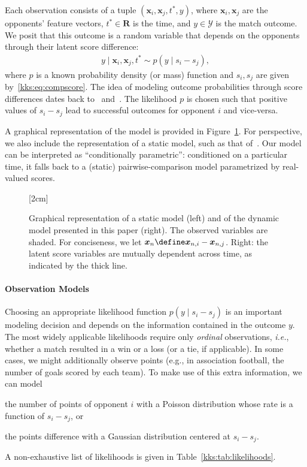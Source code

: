 Each observation consists of a tuple $(\bm{x}_i, \bm{x}_j, t^*, y)$, where $\bm{x}_i, \bm{x}_j$ are the opponents' feature vectors, $t^* \in \mathbf{R}$ is the time, and $y \in \mathcal{Y}$ is the match outcome.
We posit that this outcome is a random variable that depends on the opponents through their latent score difference:
\begin{align*}
	y \mid \bm{x}_i, \bm{x}_j, t^* \sim p( y \mid s_i - s_j ),
\end{align*}
where $p$ is a known probability density (or mass) function and $s_i, s_j$ are given by~\eqref{kks:eq:compscore}.
The idea of modeling outcome probabilities through score differences dates back to~\citet{thurstone1927law} and~\citet{zermelo1928berechnung}.
The likelihood $p$ is chosen such that positive values of $s_i - s_j$ lead to successful outcomes for opponent $i$ and vice-versa.

A graphical representation of the model is provided in Figure~\ref{kks:fig:pgms}.
For perspective, we also include the representation of a static model, such as that of~\citet{thurstone1927law}.
Our model can be interpreted as ``conditionally parametric'': conditioned on a particular time, it falls back to a (static) pairwise-comparison model parametrized by real-valued scores.

\begin{figure}[t]
	[2cm]{
		
	}
	\hfill
	\caption{
		Graphical representation of a static model (left) and of the dynamic model presented in this paper (right).
		The observed variables are shaded.
		For conciseness, we let $\bm{x}_n \define \bm{x}_{n,i} - \bm{x}_{n,j}$.
		Right: the latent score variables are mutually dependent across time, as indicated by the thick line.}
	\label{kks:fig:pgms}
\end{figure}

\paragraph{Observation Models}
Choosing an appropriate likelihood function $p(y \mid s_i - s_j)$ is an important modeling decision and depends on the information contained in the outcome $y$.
The most widely applicable likelihoods require only \emph{ordinal} observations, \textit{i.e.}, whether a match resulted in a win or a loss (or a tie, if applicable).
In some cases, we might additionally observe points (e.g., in association football, the number of goals scored by each team).
To make use of this extra information, we can model
\begin{enuminline}
	\item the number of points of opponent $i$ with a Poisson distribution whose rate is a function of $s_i - s_j$, or
	\item the points difference with a Gaussian distribution centered at $s_i - s_j$.
\end{enuminline}
A non-exhaustive list of likelihoods is given in Table~\ref{kks:tab:likelihoods}.

